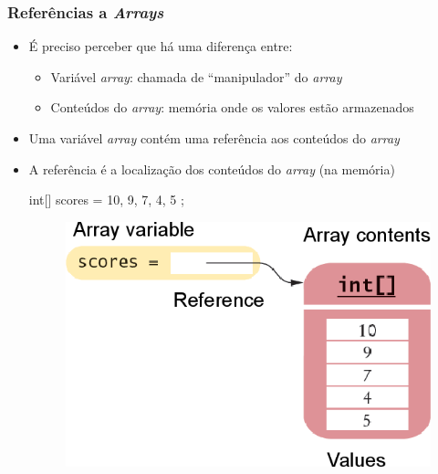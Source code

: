 \documentclass[xcolor={dvipsnames,table},aspectratio=169]{beamer}
\begin{document}
\begin{frame}[fragile]\frametitle{Referências a \emph{Arrays}}
\begin{itemize}
	\item É preciso perceber que há uma diferença entre:
	\begin{itemize}
		\item Variável \emph{array}: chamada de ``manipulador'' do \emph{array}
		\item Conteúdos do \emph{array}: memória onde os valores estão armazenados
	\end{itemize}
	\item Uma variável \emph{array} contém uma referência aos conteúdos do \emph{array}
	\item A referência é a localização dos conteúdos do \emph{array} (na memória)
{\footnotesize
\begin{javacode}
int[] scores = { 10, 9, 7, 4, 5 };
\end{javacode}
}
\begin{figure}[h]
	\includegraphics[height=0.3\paperheight,center]{pucrs-ep-fprog-unidade_06-arrays-laminas-referencia_a_arrays.png}
\end{figure}
\end{itemize}
\end{frame}
\end{document}
